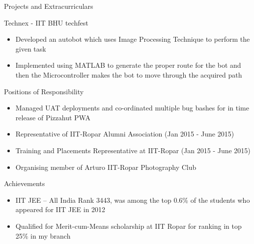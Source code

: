\documentclass{article}
\newlength{\tabin}
\newlength{\secsep}
\newcommand{\lineunder}{\vspace*{-8pt} \\ \hspace*{-6pt} \hrulefill \\ \vspace*{-15pt}}
\newenvironment{tabbedsection}[1]{
  \begin{list}{}{
      \setlength{\itemsep}{0pt}
      \setlength{\labelsep}{0pt}
      \setlength{\labelwidth}{0pt}
      \setlength{\leftmargin}{\tabin}
      \setlength{\rightmargin}{\tabin}
      \setlength{\listparindent}{0pt}
      \setlength{\parsep}{0pt}
      \setlength{\parskip}{0pt}
      \setlength{\partopsep}{0pt}
      \setlength{\topsep}{#1}
    }
  \item[]
}{\end{list}}
\newenvironment{resume_section}[1]{
  \filbreak
  \vspace{2\secsep}
  \textsc{\large#1}
  \lineunder
  \begin{tabbedsection}{\secsep}
}{\end{tabbedsection}}
\newenvironment{resume_subsection}[2][]{
  \textbf{#2} \hfill {\footnotesize #1} \hspace{2em}
  \begin{tabbedsection}{0.5\secsep}
}{\end{tabbedsection}}
\newenvironment{subitems}{
  \renewcommand{\labelitemi}{-}
  \begin{itemize}
      \setlength{\labelsep}{1em}
}{\end{itemize}}
\begin{document}
\begin{resume_section}{\color{myblue}Projects and Extracurriculars}
  \begin{resume_subsection}[(March 2014)]{Technex - IIT BHU techfest}
    \begin{subitems}
      \item Developed an autobot which uses Image Processing Technique to perform the given task
      \item Implemented using MATLAB to generate the proper route for the bot and then the Microcontroller makes the bot to move through the acquired path
    \end{subitems}
  \end{resume_subsection}
  
  \begin{resume_subsection}{Positions of Responsibility}
    \begin{subitems}
      \item Managed UAT deployments and co-ordinated multiple bug bashes for in time release of Pizzahut PWA
      \item Representative of IIT-Ropar Alumni Association (Jan 2015 - June 2015)
      \item Training and Placements Representative at IIT-Ropar (Jan 2015 - June 2015)
      \item Organising member of Arturo IIT-Ropar Photography Club
    \end{subitems}
  \end{resume_subsection}
  
  \begin{resume_subsection}{Achievements}
    \begin{subitems}
      \item IIT JEE – All India Rank 3443, was among the top 0.6\% of the students who appeared for IIT JEE in 2012
      \item Qualified for Merit-cum-Means scholarship at IIT Ropar for ranking in top 25\% in my
branch
    \end{subitems}
  \end{resume_subsection}
\end{resume_section}
\end{document}
